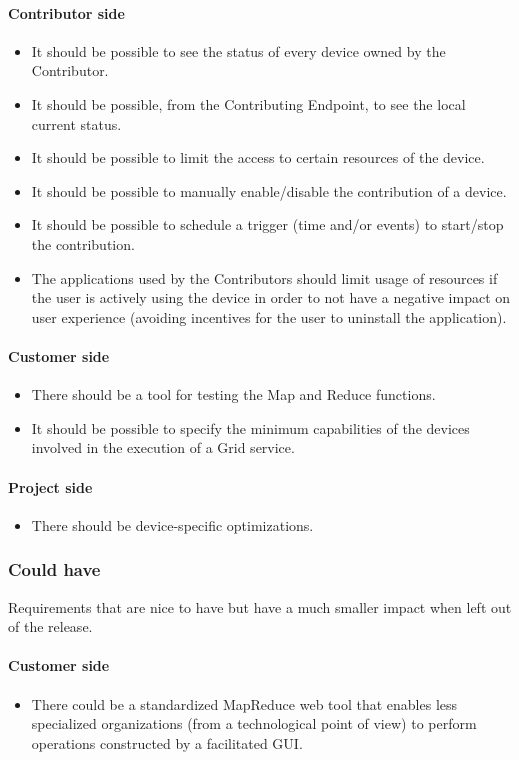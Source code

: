 \paragraph{Contributor side}
\begin{itemize}
    \item It should be possible to see the status of every device owned by the Contributor.
    \item It should be possible, from the Contributing Endpoint, to see the local current status.
    \item It should be possible to limit the access to certain resources of the device.
    \item It should be possible to manually enable/disable the contribution of a device.
    \item It should be possible to schedule a trigger (time and/or events) to start/stop the contribution.
    \item The applications used by the Contributors should limit usage of resources if the user is actively using the device in order to not have a negative impact on user experience (avoiding incentives for the user to uninstall the application).
\end{itemize}
\paragraph{Customer side}
\begin{itemize}
    \item There should be a tool for testing the Map and Reduce functions.
    \item It should be possible to specify the minimum capabilities of the devices involved in the execution of a Grid service.
\end{itemize}
\paragraph{Project side}
\begin{itemize}
    \item There should be device-specific optimizations.
\end{itemize}

\subsubsection{Could have}
Requirements that are nice to have but have a much smaller impact when left out of the release.
\paragraph{Customer side}
\begin{itemize}
    \item There could be a standardized MapReduce web tool that enables less specialized organizations (from a technological point of view) to perform operations constructed by a facilitated GUI.
\end{itemize}

